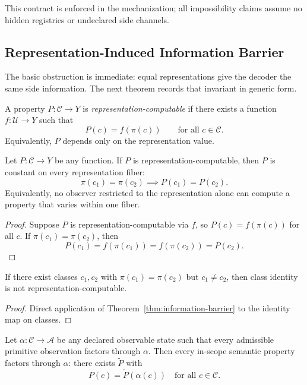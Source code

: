 This contract is enforced in the mechanization; all impossibility claims assume no hidden registries or undeclared side channels.

\subsection{Representation-Induced Information Barrier}

The basic obstruction is immediate: equal representations give the decoder the same side information. The next theorem records that invariant in generic form.

\begin{definition}
A property $P:\mathcal C \to Y$ is \emph{representation-computable} if there exists a function $f: \mathcal U \to Y$ such that
\[
P(c) = f(\pi(c))
\qquad\text{for all } c \in \mathcal C.
\]
Equivalently, $P$ depends only on the representation value.
\end{definition}

\begin{theorem}\label{thm:information-barrier}\label{thm:info-barrier}
Let $P: \mathcal C \to Y$ be any function. If $P$ is representation-computable, then $P$ is constant on every representation fiber:
\[
\pi(c_1)=\pi(c_2) \implies P(c_1)=P(c_2).
\]
Equivalently, no observer restricted to the representation alone can compute a property that varies within one fiber.
\end{theorem}

\begin{proof}
Suppose $P$ is representation-computable via $f$, so $P(c)=f(\pi(c))$ for all $c$. If $\pi(c_1)=\pi(c_2)$, then
\[
P(c_1)=f(\pi(c_1))=f(\pi(c_2))=P(c_2).
\]
\end{proof}

\begin{corollary}\label{cor:provenance-barrier}
If there exist classes $c_1,c_2$ with $\pi(c_1)=\pi(c_2)$ but $c_1 \neq c_2$, then class identity is not representation-computable.
\end{corollary}

\begin{proof}
Direct application of Theorem~\ref{thm:information-barrier} to the identity map on classes.
\end{proof}

\begin{theorem}\label{thm:model-completeness}
Let $\alpha : \mathcal C \to \mathcal A$ be any declared observable state such that every admissible primitive observation factors through $\alpha$. Then every in-scope semantic property factors through $\alpha$: there exists $\tilde P$ with
\[
P(c)=\tilde P(\alpha(c)) \quad \text{for all } c\in\mathcal C.
\]
\end{theorem}


